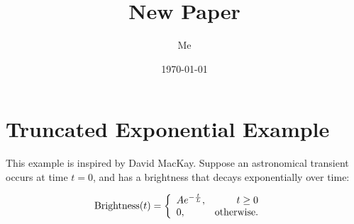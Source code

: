 \documentclass[a4paper, 11pt]{article}
\title{New Paper}
\author{Me}
\date{\today}
\begin{document}


\section{Truncated Exponential Example}
This example is inspired by David MacKay.
Suppose an astronomical transient
occurs at time $t=0$, and has a brightness that
decays exponentially over time:

\begin{align}
\textnormal{Brightness}(t) &=
\left\{
\begin{array}{lr}
Ae^{-\frac{t}{L}}, & t \geq 0\\
0,                 & \textnormal{otherwise}.
\end{array}
\right.
\end{align}




{}
\end{document}
